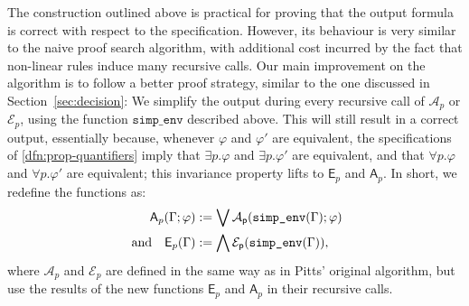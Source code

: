 \documentclass[english,review]{jflart}
\theoremstyle{definition}
\theoremstyle{plain}
\newcommand{\simpenv}[1]{\mbox{\texttt{simp\_env}}(#1)}
\newcommand{\callAp}[1]{\mathsf{\mathcal{A}_p}(#1)}
\newcommand{\callEp}[1]{\mathsf{\mathcal{E}_p}(#1)}
\newcommand{\Ap}[1]{\mathsf{A}_{p}(#1)}
\newcommand{\Ep}[1]{\mathsf{E}_{p}(#1)}
\renewcommand{\phi}{\varphi}
\begin{document}
The construction outlined above is practical for proving that the output formula is correct with respect to the specification.
However, its behaviour is very similar to the naive proof search algorithm, with additional cost incurred by the fact that non-linear rules induce many recursive calls.
Our main improvement on the algorithm is to follow a better proof strategy,
similar to the one discussed in Section~\ref{sec:decision}: We simplify the output during every recursive call of $\mathcal{A}_p$ or $\mathcal{E}_p$, using the function $\texttt{simp\_env}$ described above. This will still result in a correct output, essentially because, whenever $\phi$ and $\phi'$ are equivalent, the specifications of \cref{dfn:prop-quantifiers} imply that $\exists p. \phi$ and $\exists p. \phi'$ are equivalent, and that $\forall p. \phi$ and $\forall p. \phi'$ are equivalent; this invariance property lifts to $\mathsf{E}_p$ and $\mathsf{A}_p$.
In short, we redefine the functions as:
\begin{align}
\Ap{\Gamma; \phi} &:= \bigvee \callAp{\simpenv\Gamma; \phi} \label{Apsimp} \\ 
\text{ and } \ \ \Ep{\Gamma} &:= \bigwedge \callEp{\simpenv\Gamma}, \label{Epsimp}
\end{align} 
where $\mathcal{A}_p$ and $\mathcal{E}_p$ are defined in the same way as in Pitts' original algorithm, but use the results of the new functions $\mathsf{E}_p$ and $\mathsf{A}_p$ in their recursive calls.
\end{document}

